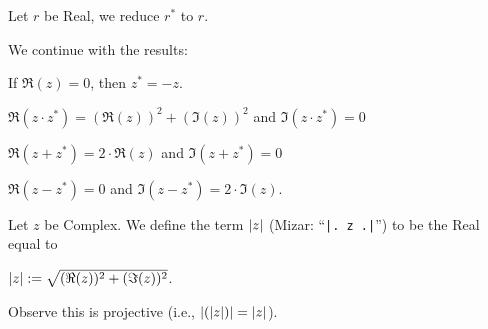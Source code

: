 \documentclass{article}
\begin{document}
Let $r$ be Real, we reduce $r^{*}$ to $r$.

We continue with the results:
\begin{thm}
\item\label{complex1:39} If $\Re(z)=0$, then $z^{*}=-z$.
\item\label{complex1:40} $\Re(z\cdot z^{*})=(\Re(z))^{2}+(\Im(z))^{2}$
  and $\Im(z\cdot z^{*})=0$
\item\label{complex1:41} $\Re(z+z^{*})=2\cdot\Re(z)$ and $\Im(z+z^{*})=0$
\item\label{complex1:42} $\Re(z-z^{*})=0$ and $\Im(z-z^{*})=2\cdot\Im(z)$.
\end{thm}

\begin{definition}
Let $z$ be Complex.
We define the term $\lvert z\rvert$ (Mizar: ``\verb#|. z .|#'') to be the Real
equal to
\begin{defn}
\item $\lvert z\rvert := \sqrt{(\Re(z))^{2}+(\Im(z))^{2}}$.
\end{defn}
Observe this is projective (i.e., $\lvert(\lvert z\rvert)\rvert=\lvert z\rvert$).
\end{definition}
\end{document}
